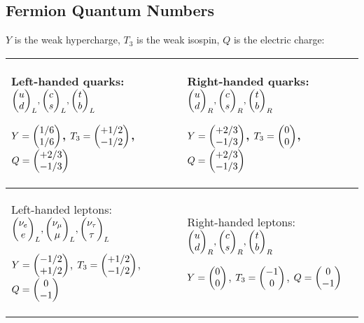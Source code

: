 	\subsection{Fermion Quantum Numbers}
		\label{Sec:FermionConstants}
		$Y$ is the weak hypercharge, $T_3$ is the weak isospin, $Q$ is the electric charge:
		\begin{center}
			\begin{tabular}{| L{.45\textwidth} | L{.45\textwidth} |}
				\hline
				Left-handed quarks: $\doublet{u}{d}_L, \doublet{c}{s}_L, \doublet{t}{b}_L$

				$Y=\doublet{1/6}{1/6}$, $T_3=\doublet{+1/2}{-1/2}$, $Q=\doublet{+2/3}{-1/3}$
				&
				Right-handed quarks: $\doublet{u}{d}_R, \doublet{c}{s}_R, \doublet{t}{b}_R$

				$Y=\doublet{+2/3}{-1/3}$, $T_3=\doublet{0}{0}$, $Q=\doublet{+2/3}{-1/3}$
				\\
				\hline
				Left-handed leptons: $\doublet{\nu_e}{e}_L, \doublet{\nu_\mu}{\mu}_L, \doublet{\nu_\tau}{\tau}_L$

				$Y=\doublet{-1/2}{+1/2}$, $T_3=\doublet{+1/2}{-1/2}$, $Q=\doublet{0}{-1}$
				&
				Right-handed leptons: $\doublet{u}{d}_R, \doublet{c}{s}_R, \doublet{t}{b}_R$

				$Y=\doublet{0}{0}$, $T_3=\doublet{-1}{0}$, $Q=\doublet{0}{-1}$
				\\
				\hline
			\end{tabular}
		\end{center}

		\renewcommand{\arraystretch}{2.0}

